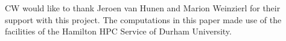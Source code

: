 CW would like to thank Jeroen van Hunen and Marion Weinzierl for their support with this project.
The computations in this paper made use of the facilities of the Hamilton HPC Service of Durham University.